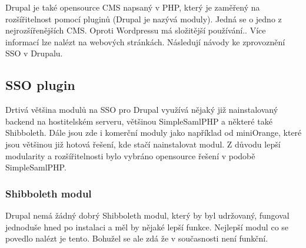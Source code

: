 Drupal je také opensource CMS napsaný v PHP, který je zaměřený na rozšířitelnost pomocí pluginů (Drupal je nazývá moduly). Jedná se o jedno z nejrozšířenějších CMS. Oproti Wordpressu má složitější používání.. Více informací lze nalézt na webových stránkách.\cite{drupal}
Následují návody ke zprovoznění SSO v Drupalu.

\subsection{SSO plugin} %
Drtivá většina modulů na SSO pro Drupal využívá nějaký již nainstalovaný backend na hostitelském serveru, většinou SimpleSamlPHP a některé také Shibboleth. Dále jsou zde i komerční moduly jako například od miniOrange\cite{miniorange}, které jsou většinou již hotová řešení, kde stačí nainstalovat modul. Z důvodu lepší modularity a rozšířitelnosti bylo vybráno opensource řešení v podobě SimpleSamlPHP.

\subsubsection{Shibboleth modul} %
    Drupal nemá žádný dobrý Shibboleth modul, který by byl udržovaný, fungoval jednoduše hned po instalaci a měl by nějaké lepší funkce. Nejlepší modul co se povedlo nalézt je tento\cite{basicshib}. Bohužel se ale zdá že v současnosti není funkční.
